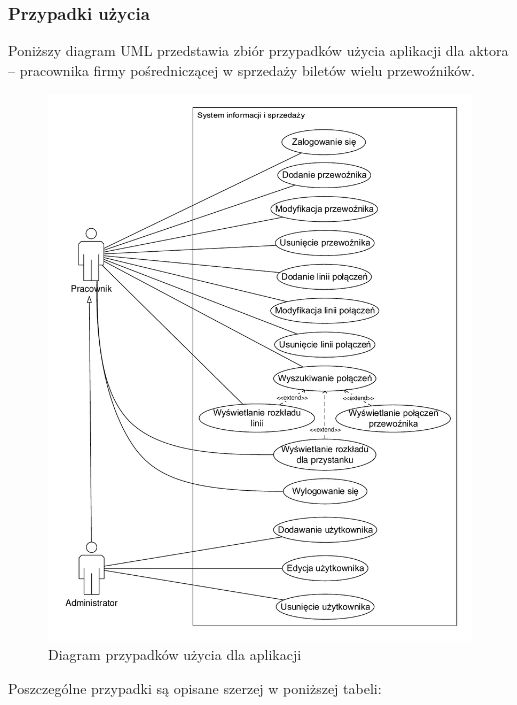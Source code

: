 \documentclass[10pt,a4paper]{article}
\begin{document}
\subsubsection*{Przypadki użycia}
Poniższy diagram UML przedstawia zbiór przypadków użycia aplikacji dla aktora -- pracownika firmy pośredniczącej w sprzedaży biletów wielu przewoźników.
\begin{figure}[H]
	\centering
	\includegraphics[width=12cm]{use-case.pdf}
	\caption{Diagram przypadków użycia dla aplikacji}
\end{figure}
Poszczególne przypadki są opisane szerzej w poniższej tabeli:
\end{document}
